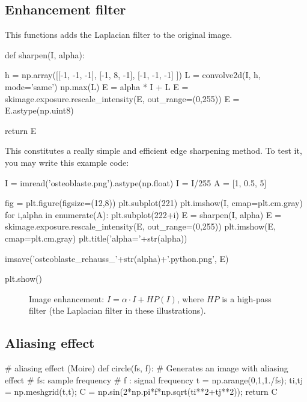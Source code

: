 \subsection{Enhancement filter}

This functions adds the Laplacian filter to the original image.
\begin{python}
def sharpen(I, alpha):
    
    h = np.array([[-1, -1, -1], [-1, 8, -1], [-1, -1, -1] ])
    L = convolve2d(I, h, mode='same')
    np.max(L)
    E = alpha * I + L
    E = skimage.exposure.rescale_intensity(E, out_range=(0,255))
    E = E.astype(np.uint8)
    
    return E
\end{python}

This constitutes a really simple and efficient edge sharpening method. To test it, you may write this example code:
\begin{python}
I = imread('osteoblaste.png').astype(np.float)
I = I/255
A = [1, 0.5, 5]

fig = plt.figure(figsize=(12,8))
plt.subplot(221)
plt.imshow(I, cmap=plt.cm.gray)
for i,alpha in enumerate(A):
    plt.subplot(222+i)
    E = sharpen(I, alpha)
    E = skimage.exposure.rescale_intensity(E, out_range=(0,255))
    plt.imshow(E, cmap=plt.cm.gray)
    plt.title('alpha='+str(alpha))
    
    imsave('osteoblaste_rehauss_'+str(alpha)+'.python.png', E)

plt.show()
\end{python}


\begin{figure}[htbp]
 \centering
 
 \hspace{1cm}
 
 \hspace{1cm}

 \caption{Image enhancement: $I=\alpha\cdot I+HP(I)$, where $HP$ is a high-pass filter (the Laplacian filter in these illustrations).}
 \label{fig:introduction:matlab:enhancement}
\end{figure}



\subsection{Aliasing effect}
\begin{python}
# aliasing effect (Moire)
def circle(fs, f):
    # Generates an image with aliasing effect
    # fs: sample frequency
    # f : signal frequency
    t = np.arange(0,1,1./fs);
    ti,tj = np.meshgrid(t,t);
    C = np.sin(2*np.pi*f*np.sqrt(ti**2+tj**2));
    return C
\end{python}


